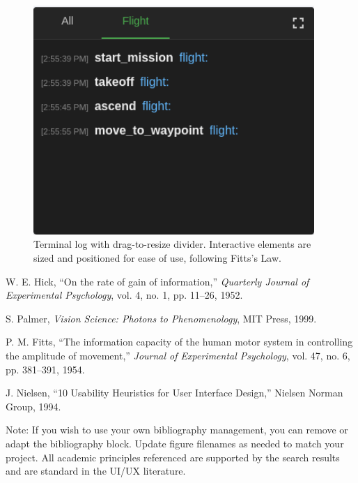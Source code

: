 \begin{figure}[H]
    \centering
    \includegraphics[width=0.95\textwidth]{7. Figures/Frontend/frontend-log.png}
    \caption{Terminal log with drag-to-resize divider. Interactive elements are sized and positioned for ease of use, following Fitts’s Law.}
    \label{fig:frontend-log}
\end{figure}
    
    \begin{thebibliography}{9}
    W. E. Hick, ``On the rate of gain of information,'' \emph{Quarterly Journal of Experimental Psychology}, vol. 4, no. 1, pp. 11–26, 1952.
    
    S. Palmer, \emph{Vision Science: Photons to Phenomenology}, MIT Press, 1999.
    
    P. M. Fitts, ``The information capacity of the human motor system in controlling the amplitude of movement,'' \emph{Journal of Experimental Psychology}, vol. 47, no. 6, pp. 381–391, 1954.
    
    J. Nielsen, ``10 Usability Heuristics for User Interface Design,'' Nielsen Norman Group, 1994.
    
    \end{thebibliography}
    
    Note: If you wish to use your own bibliography management, you can remove or adapt the bibliography block. Update figure filenames as needed to match your project. All academic principles referenced are supported by the search results and are standard in the UI/UX literature.

